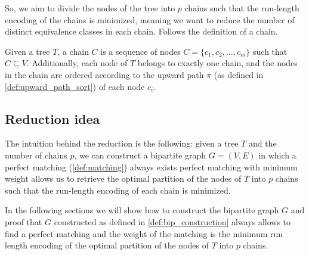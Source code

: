 So, we aim to divide the nodes of the tree into $p$ chains such that the run-length encoding of the chains is minimized, meaning we want to reduce the number of distinct equivalence classes in each chain. Follows the definition of a chain.

\begin{definition}[Chains] \label{def:chains}
    Given a tree $T$, a chain $C$ is a sequence of nodes $C = \{c_1, c_2, \dots, c_m\}$ such that $C\subseteq V$. Additionally, each node of $T$ belongs to exactly one chain, and the nodes in the chain are ordered according to the upward path $\pi$ (as defined in \cref{def:upward_path_sort}) of each node $c_i$.
\end{definition}

\subsection{Reduction idea}
The intuition behind the reduction is the following: given a tree $T$ and the number of chains $p$, we can construct a bipartite graph $G = (V, E)$ in which a perfect matching (\cref{def:matching}) always exists perfect matching with minimum weight allows us to retrieve the optimal partition of the nodes of $T$ into $p$ chains such that the run-length encoding of each chain is minimized.

In the following sections we will show how to construct the bipartite graph $G$ and proof that $G$ constructed as defined in \cref{def:bip_construction} always allows to find a perfect matching and the weight of the matching is the minimum run length encoding of the optimal partition of the nodes of $T$ into $p$ chains.

